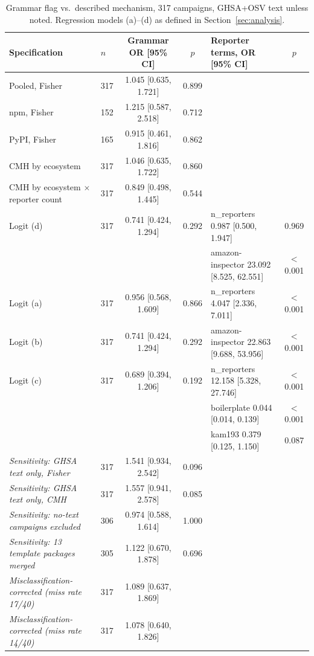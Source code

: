 \documentclass[10pt,conference]{IEEEtran}
\begin{document}
\begin{table}[t]
\centering
\caption{Grammar flag vs.\ described mechanism, 317 campaigns, GHSA+OSV
text unless noted. Regression models (a)--(d) as defined in
Section~\ref{sec:analysis}.}
\label{tab:main}
\begin{tabular}{llcclc}
\toprule
Specification & $n$ & Grammar OR [95\% CI] & $p$ & Reporter terms, OR [95\% CI] & $p$ \\
\midrule
Pooled, Fisher & 317 & 1.045 [0.635, 1.721] & 0.899 & & \\
npm, Fisher & 152 & 1.215 [0.587, 2.518] & 0.712 & & \\
PyPI, Fisher & 165 & 0.915 [0.461, 1.816] & 0.862 & & \\
CMH by ecosystem & 317 & 1.046 [0.635, 1.722] & 0.860 & & \\
CMH by ecosystem $\times$ reporter count & 317 & 0.849 [0.498, 1.445] & 0.544 & & \\
\midrule
Logit (d) & 317 & 0.741 [0.424, 1.294] & 0.292 & n\_reporters 0.987 [0.500, 1.947] & 0.969 \\
 & & & & amazon-inspector 23.092 [8.525, 62.551] & $<$0.001 \\
Logit (a) & 317 & 0.956 [0.568, 1.609] & 0.866 & n\_reporters 4.047 [2.336, 7.011] & $<$0.001 \\
Logit (b) & 317 & 0.741 [0.424, 1.294] & 0.292 & amazon-inspector 22.863 [9.688, 53.956] & $<$0.001 \\
Logit (c) & 317 & 0.689 [0.394, 1.206] & 0.192 & n\_reporters 12.158 [5.328, 27.746] & $<$0.001 \\
 & & & & boilerplate 0.044 [0.014, 0.139] & $<$0.001 \\
 & & & & kam193 0.379 [0.125, 1.150] & 0.087 \\
\midrule
\emph{Sensitivity: GHSA text only, Fisher} & 317 & 1.541 [0.934, 2.542] & 0.096 & & \\
\emph{Sensitivity: GHSA text only, CMH} & 317 & 1.557 [0.941, 2.578] & 0.085 & & \\
\emph{Sensitivity: no-text campaigns excluded} & 306 & 0.974 [0.588, 1.614] & 1.000 & & \\
\emph{Sensitivity: 13 template packages merged} & 305 & 1.122 [0.670, 1.878] & 0.696 & & \\
\emph{Misclassification-corrected (miss rate 17/40)} & 317 & 1.089 [0.637, 1.869] & & & \\
\emph{Misclassification-corrected (miss rate 14/40)} & 317 & 1.078 [0.640, 1.826] & & & \\
\bottomrule
\end{tabular}
\end{table}
\end{document}

